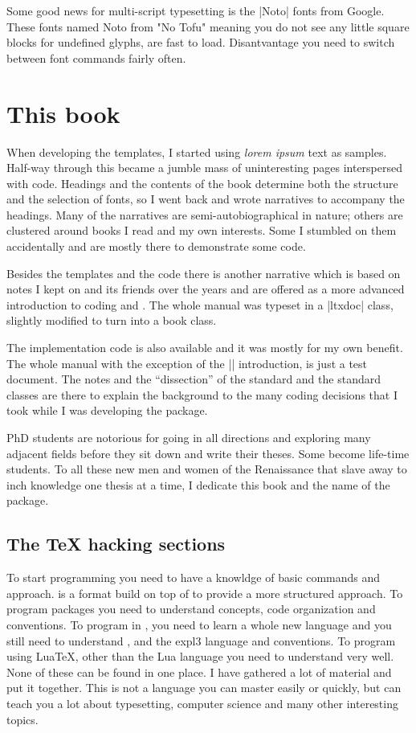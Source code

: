 Some good news for multi-script typesetting is the |Noto| fonts from Google. These fonts named Noto from "No Tofu" meaning you do not see any little square blocks for undefined glyphs, are fast to load. Disantvantage you need to switch between font commands fairly often.

\section{This book}

When developing the templates, I started using \emph{lorem ipsum} text as samples. Half-way through this
became a jumble mass of uninteresting pages interspersed with code. Headings and the contents of the book
determine both the structure and the selection of fonts, so I went back and wrote narratives  to accompany
the headings. Many of the narratives are semi-autobiographical in nature; others are clustered around books I read and my own interests. Some I stumbled on them accidentally and are mostly there to demonstrate some code.

Besides the templates and the code there is another narrative which is based on notes I kept on \tex and its friends over the years and are offered as a more advanced introduction to coding \latexe and \tex. The whole manual was typeset in a |ltxdoc| class, slightly modified to turn into a book class.

The implementation code is also available and it was mostly for my own benefit. The whole manual with the exception of the |\cxset| introduction, is just a test document. The notes and the “dissection” of the standard \latexe and the standard classes are there to explain the background to the many coding decisions that I took while I was developing the package.

PhD students are notorious for going in all directions and exploring many adjacent fields before they sit down and write their theses. Some become life-time students. To all these new men and women of the Renaissance that slave away to inch knowledge one thesis at a time, I dedicate this book and the name of the package.

\subsection{The TeX hacking sections}

To start programming \tex you need to have a knowldge of \tex basic commands and approach.  is a format build on top of \tex to provide a more structured approach. To program \latexe packages you need to understand \latexe concepts, code organization and conventions. To program in , you need to learn a whole new language and you still need to understand \tex, \latexe and the expl3 language and conventions. To program using LuaTeX, other than the Lua language you need to understand \tex very well.
None of these can be found in one place.  I have gathered a lot of material and put it together. This is not a language you can master easily or quickly, but can teach you a lot about typesetting, computer science and many other interesting topics.



